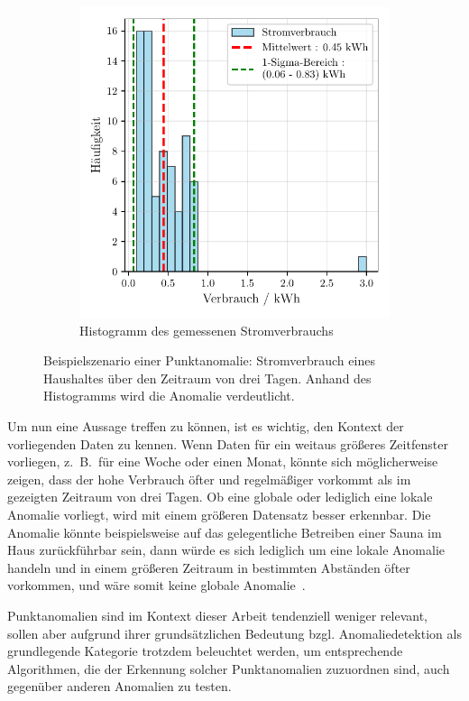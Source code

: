 \begin{figure}[!t]
\begin{subfigure}[b]{0.49\linewidth}
        \includegraphics[width=\linewidth]{ch4_anomalien/abbildungen/punktanomalie_hist.pdf}
        \caption{\centering Histogramm des gemessenen Stromverbrauchs}\label{subfig:smartmeter_histogramm}
    \end{subfigure}
    \caption{\centering Beispielszenario einer Punktanomalie: Stromverbrauch eines Haushaltes über den Zeitraum von
    drei Tagen. Anhand des Histogramms wird die Anomalie verdeutlicht.}\label{fig:punktanomalie}
\end{figure}

Um nun eine Aussage treffen zu können, ist es wichtig, den Kontext der vorliegenden Daten zu kennen. Wenn Daten für ein weitaus größeres
Zeitfenster vorliegen, z.~B.~für eine Woche oder einen Monat, könnte sich möglicherweise zeigen, dass der hohe Verbrauch öfter und
regelmäßiger vorkommt als im gezeigten Zeitraum von drei Tagen. Ob eine globale oder lediglich eine lokale Anomalie vorliegt, wird
mit einem größeren Datensatz besser erkennbar. Die Anomalie könnte beispielsweise auf das gelegentliche Betreiben einer Sauna im Haus
zurückführbar sein, dann würde es sich lediglich um eine lokale Anomalie handeln und in einem größeren Zeitraum in bestimmten Abständen
öfter vorkommen, und wäre somit keine globale Anomalie~\Cite[Kap.~10]{Tan2014}.

Punktanomalien sind im Kontext dieser Arbeit tendenziell weniger relevant, sollen aber aufgrund ihrer grundsätzlichen Bedeutung bzgl.
Anomaliedetektion als grundlegende Kategorie trotzdem beleuchtet werden, um entsprechende Algorithmen, die der Erkennung solcher
Punktanomalien zuzuordnen sind, auch gegenüber anderen Anomalien zu testen.

